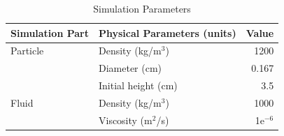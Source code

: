 






\begin{table}[ht]
    \centering
    \caption{Simulation Parameters} \label{table1-chap4}
    \begin{tabular}{llr}
        \toprule
        \hline
        Simulation Part         & Physical Parameters (units) & Value \\
        \hline
        \midrule
        Particle                 & Density (kg/m$^3$)          & 1200    \\
                         & Diameter (cm)          & 0.167    \\
                         & Initial height (cm)          & 3.5    \\
                         \hline
        Fluid                  & Density (kg/m$^3$)           & 1000   \\
                                & Viscosity (m$^2$/s)         & 1e$^{-6}$    \\
                                \hline
        \bottomrule
     \end{tabular}
\end{table}

